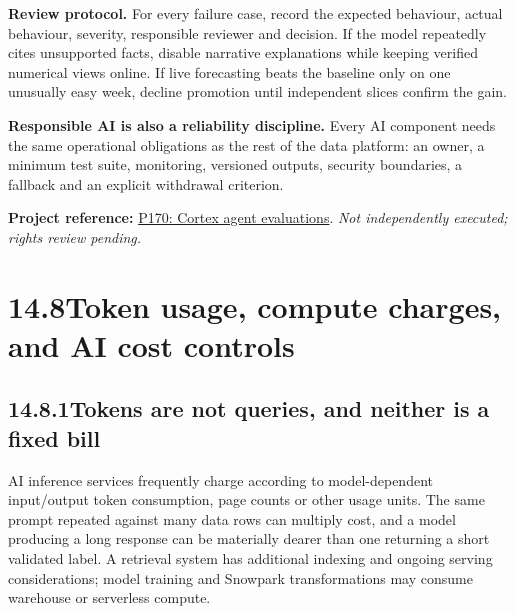 \documentclass[11pt,twoside]{article}
\newcommand{\topic}[2]{\subsection*{#1\quad #2}}
\newcommand{\repo}[2]{\par\begingroup\fontsize{8.0}{9.6}\selectfont\sffamily\color{inkgray}\textbf{Project reference:} \href{#2}{#1}. \textit{Not independently executed; rights review pending.}\par\endgroup}
\begin{document}
\textbf{Review protocol.} For every failure case, record the expected behaviour, actual behaviour, severity, responsible reviewer and decision. If the model repeatedly cites unsupported facts, disable narrative explanations while keeping verified numerical views online. If live forecasting beats the baseline only on one unusually easy week, decline promotion until independent slices confirm the gain.
\begin{insight}\textbf{Responsible AI is also a reliability discipline.} Every AI component needs the same operational obligations as the rest of the data platform: an owner, a minimum test suite, monitoring, versioned outputs, security boundaries, a fallback and an explicit withdrawal criterion.\end{insight}
\repo{P170: Cortex agent evaluations}{https://github.com/Snowflake-Labs/sfguide-getting-started-with-cortex-agent-evaluations}

\newpage

\section*{14.8\quad Token usage, compute charges, and AI cost controls}
\topic{14.8.1}{Tokens are not queries, and neither is a fixed bill}
AI inference services frequently charge according to model-dependent input/output token consumption, page counts or other usage units. The same prompt repeated against many data rows can multiply cost, and a model producing a long response can be materially dearer than one returning a short validated label. A retrieval system has additional indexing and ongoing serving considerations; model training and Snowpark transformations may consume warehouse or serverless compute.
\end{document}
